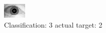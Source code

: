 \begin{figure}[h!]
\begin{center}
\includegraphics[width=0.60\columnwidth]{figures/ID1636_class_3_target_2.png}
\end{center}
\caption{ Classification: 3 actual target: 2}
\label{fig:ID1636_class_3_target_2}
\end{figure}
